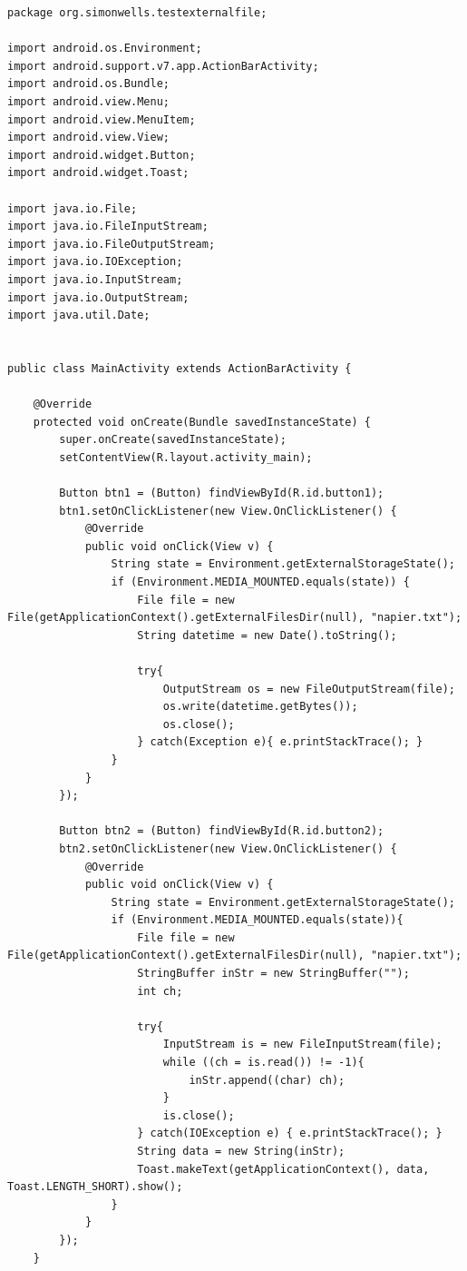 \begin{lstlisting}
package org.simonwells.testexternalfile;

import android.os.Environment;
import android.support.v7.app.ActionBarActivity;
import android.os.Bundle;
import android.view.Menu;
import android.view.MenuItem;
import android.view.View;
import android.widget.Button;
import android.widget.Toast;

import java.io.File;
import java.io.FileInputStream;
import java.io.FileOutputStream;
import java.io.IOException;
import java.io.InputStream;
import java.io.OutputStream;
import java.util.Date;


public class MainActivity extends ActionBarActivity {

    @Override
    protected void onCreate(Bundle savedInstanceState) {
        super.onCreate(savedInstanceState);
        setContentView(R.layout.activity_main);

        Button btn1 = (Button) findViewById(R.id.button1);
        btn1.setOnClickListener(new View.OnClickListener() {
            @Override
            public void onClick(View v) {
                String state = Environment.getExternalStorageState();
                if (Environment.MEDIA_MOUNTED.equals(state)) {
                    File file = new File(getApplicationContext().getExternalFilesDir(null), "napier.txt");
                    String datetime = new Date().toString();

                    try{
                        OutputStream os = new FileOutputStream(file);
                        os.write(datetime.getBytes());
                        os.close();
                    } catch(Exception e){ e.printStackTrace(); }
                }
            }
        });

        Button btn2 = (Button) findViewById(R.id.button2);
        btn2.setOnClickListener(new View.OnClickListener() {
            @Override
            public void onClick(View v) {
                String state = Environment.getExternalStorageState();
                if (Environment.MEDIA_MOUNTED.equals(state)){
                    File file = new File(getApplicationContext().getExternalFilesDir(null), "napier.txt");
                    StringBuffer inStr = new StringBuffer("");
                    int ch;

                    try{
                        InputStream is = new FileInputStream(file);
                        while ((ch = is.read()) != -1){
                            inStr.append((char) ch);
                        }
                        is.close();
                    } catch(IOException e) { e.printStackTrace(); }
                    String data = new String(inStr);
                    Toast.makeText(getApplicationContext(), data, Toast.LENGTH_SHORT).show();
                }
            }
        });
    }



\end{lstlisting}
